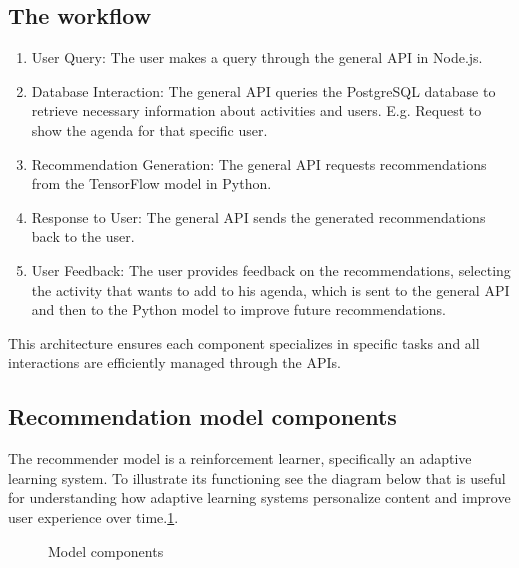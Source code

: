\documentclass[10pt,twocolumn,letterpaper]{article}
\begin{document}
\subsection{The workflow}
\begin{enumerate}
\item User Query: The user makes a query through the general API in Node.js.
\item Database Interaction: The general API queries the PostgreSQL database to retrieve necessary information about activities and users. E.g. Request to show the agenda for that specific user.
\item Recommendation Generation: The general API requests recommendations from the TensorFlow model in Python.
\item Response to User: The general API sends the generated recommendations back to the user.
\item User Feedback: The user provides feedback on the recommendations, selecting the activity that wants to add to his agenda, which is sent to the general API and then to the Python model to improve future recommendations.
\end{enumerate}
This architecture ensures each component specializes in specific tasks and all interactions are efficiently managed through the APIs.

\subsection{Recommendation model components}
The recommender model is a reinforcement learner, specifically an adaptive learning system. To illustrate its functioning see the diagram below that is useful for understanding how adaptive learning systems personalize content and improve user experience over time.\ref{fig:model_components}.
\begin{figure}[h]
       \centering
       \caption{Model components}
    \label{fig:model_components}
\end{figure}
\end{document}
